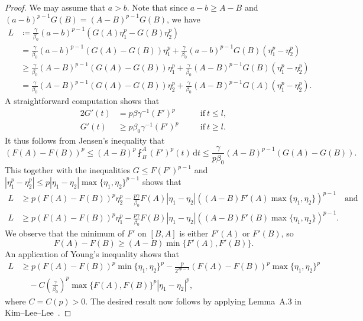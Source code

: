 \documentclass[11pt]{amsart}
\theoremstyle{plain}
\theoremstyle{definition}
\numberwithin{equation}{section}
\begin{document}
\begin{proof}
We may assume that $a>b$. Note that since $a-b \geq A-B$ and $(a-b)^{p-1}G(B)=(A-B)^{p-1}G(B)$, we have
\begin{align*}
L
&\coloneqq \frac{\gamma}{\beta_0} (a-b)^{p-1} (G(A) \eta_1^p - G(B) \eta_2^p) \\
&= \frac{\gamma}{\beta_0} (a-b)^{p-1} (G(A) - G(B))\eta_1^p + \frac{\gamma}{\beta_0} (a-b)^{p-1} G(B) (\eta_1^p - \eta_2^p) \\
&\geq \frac{\gamma}{\beta_0} (A-B)^{p-1} (G(A) - G(B))\eta_1^p + \frac{\gamma}{\beta_0} (A-B)^{p-1} G(B) (\eta_1^p - \eta_2^p) \\
&= \frac{\gamma}{\beta_0} (A-B)^{p-1} (G(A) - G(B))\eta_2^p + \frac{\gamma}{\beta_0} (A-B)^{p-1} G(A) (\eta_1^p - \eta_2^p).
\end{align*}
A straightforward computation shows that
\begin{alignat*}{2}
G'(t) &= p\beta \gamma^{-1} (F')^p &&\text{if}~t \leq l, \\
G'(t) &\geq p\beta_0 \gamma^{-1} (F')^p \quad&&\text{if}~t \geq l.
\end{alignat*}
It thus follows from Jensen's inequality that
\begin{equation*}
(F(A)-F(B))^p \leq (A-B)^p \fint_B^A (F')^p(t) \,\mathrm{d}t \leq \frac{\gamma}{p\beta_0} (A-B)^{p-1}(G(A)-G(B)).
\end{equation*}
This together with the inequalities $G \leq F(F')^{p-1}$ and $|\eta_1^p-\eta_2^p| \leq p|\eta_1-\eta_2| \max\{\eta_1, \eta_2\}^{p-1}$ shows that
\begin{equation*}
	\begin{aligned}
		L &\geq p(F(A)-F(B))^p \eta_2^p - \frac{p\gamma}{\beta_0} F(A)|\eta_1 - \eta_2| \left( (A-B) F'(A) \max\{\eta_1, \eta_2\} \right)^{p-1} \quad\text{and}  \\
		L &\geq p(F(A)-F(B))^p \eta_1^p - \frac{p\gamma}{\beta_0} F(B)|\eta_1 - \eta_2| \left( (A-B) F'(B) \max\{\eta_1, \eta_2\} \right)^{p-1}.
	\end{aligned}
\end{equation*}
We observe that the minimum of $F'$ on $[B, A]$ is either $F'(A)$ or $F'(B)$, so
\begin{equation*}
F(A)-F(B) \geq (A-B) \min\{ F'(A), F'(B) \}.
\end{equation*}
An application of Young's inequality shows that
\begin{align*}
L
&\geq p(F(A)-F(B))^p \min\{\eta_1, \eta_2\}^p - \frac{p}{2^{2p-1}} (F(A)-F(B))^p \max\{\eta_1, \eta_2\}^p \\
&\quad - C\left( \frac{\gamma}{\beta_0} \right)^p \max\{F(A), F(B)\}^p |\eta_1-\eta_2|^p,
\end{align*}
where $C=C(p)>0$. The desired result now follows by applying Lemma~A.3 in Kim--Lee--Lee~\cite{KLL23}.
\end{proof}
\end{document}
